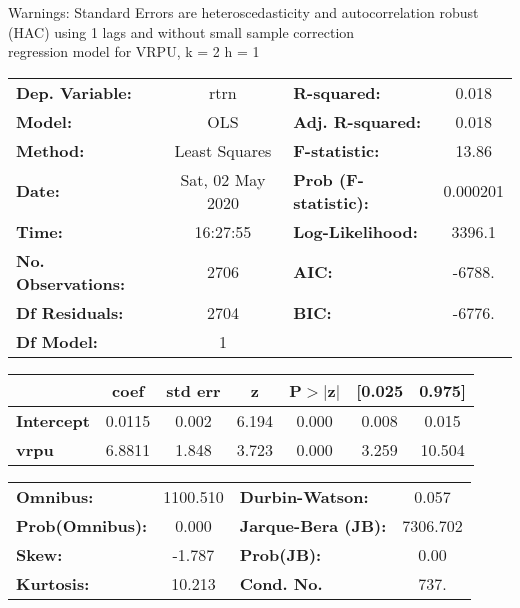 Warnings: \newline
 [1] Standard Errors are heteroscedasticity and autocorrelation robust (HAC) using 1 lags and without small sample correction\\ 

regression model for VRPU, k = 2 h = 1\begin{center}
\begin{tabular}{lclc}
\toprule
\textbf{Dep. Variable:}    &       rtrn       & \textbf{  R-squared:         } &     0.018   \\
\textbf{Model:}            &       OLS        & \textbf{  Adj. R-squared:    } &     0.018   \\
\textbf{Method:}           &  Least Squares   & \textbf{  F-statistic:       } &     13.86   \\
\textbf{Date:}             & Sat, 02 May 2020 & \textbf{  Prob (F-statistic):} &  0.000201   \\
\textbf{Time:}             &     16:27:55     & \textbf{  Log-Likelihood:    } &    3396.1   \\
\textbf{No. Observations:} &        2706      & \textbf{  AIC:               } &    -6788.   \\
\textbf{Df Residuals:}     &        2704      & \textbf{  BIC:               } &    -6776.   \\
\textbf{Df Model:}         &           1      & \textbf{                     } &             \\
\bottomrule
\end{tabular}
\begin{tabular}{lcccccc}
                   & \textbf{coef} & \textbf{std err} & \textbf{z} & \textbf{P$> |$z$|$} & \textbf{[0.025} & \textbf{0.975]}  \\
\midrule
\textbf{Intercept} &       0.0115  &        0.002     &     6.194  &         0.000        &        0.008    &        0.015     \\
\textbf{vrpu}      &       6.8811  &        1.848     &     3.723  &         0.000        &        3.259    &       10.504     \\
\bottomrule
\end{tabular}
\begin{tabular}{lclc}
\textbf{Omnibus:}       & 1100.510 & \textbf{  Durbin-Watson:     } &    0.057  \\
\textbf{Prob(Omnibus):} &   0.000  & \textbf{  Jarque-Bera (JB):  } & 7306.702  \\
\textbf{Skew:}          &  -1.787  & \textbf{  Prob(JB):          } &     0.00  \\
\textbf{Kurtosis:}      &  10.213  & \textbf{  Cond. No.          } &     737.  \\
\bottomrule
\end{tabular}
\end{center}

